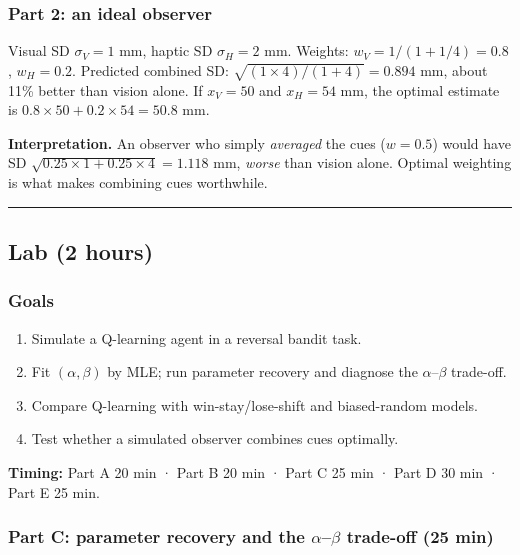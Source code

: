 \subsubsection{Part 2: an ideal observer}

Visual SD \(\sigma_V = 1\) mm, haptic SD \(\sigma_H = 2\) mm. Weights:
\(w_V = 1/(1 + 1/4) = 0.8\), \(w_H = 0.2\). Predicted combined SD:
\(\sqrt{(1 \times 4)/(1 + 4)} = 0.894\) mm, about 11\% better than
vision alone. If \(x_V = 50\) and \(x_H = 54\) mm, the optimal estimate
is \(0.8 \times 50 + 0.2 \times 54 = 50.8\) mm.

\textbf{Interpretation.} An observer who simply \emph{averaged} the cues
(\(w = 0.5\)) would have SD
\(\sqrt{0.25 \times 1 + 0.25 \times 4} = 1.118\) mm, \emph{worse} than
vision alone. Optimal weighting is what makes combining cues worthwhile.

\begin{center}\rule{0.5\linewidth}{0.5pt}\end{center}


\subsection{Lab (2 hours)}

\subsubsection{Goals}

\begin{enumerate}
\def\labelenumi{\arabic{enumi}.}
\tightlist
\item
  Simulate a Q-learning agent in a reversal bandit task.
\item
  Fit \((\alpha, \beta)\) by MLE; run parameter recovery and diagnose
  the \(\alpha\)--\(\beta\) trade-off.
\item
  Compare Q-learning with win-stay/lose-shift and biased-random models.
\item
  Test whether a simulated observer combines cues optimally.
\end{enumerate}

\textbf{Timing:} Part A 20 min · Part B 20 min · Part C 25 min · Part D
30 min · Part E 25 min.

\subsubsection{Part C: parameter recovery and the \ensuremath{\alpha}--\ensuremath{\beta} trade-off (25
min)}


